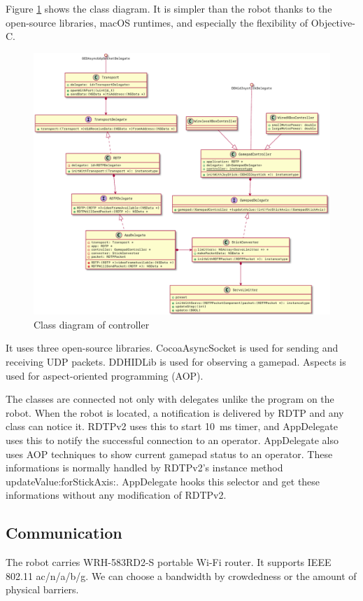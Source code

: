 \documentclass[journal]{IEEEtran}
\begin{document}
Figure \ref{fig:class_controller} shows the class diagram.
It is simpler than the robot thanks to the open-source libraries, macOS runtimes, and especially the flexibility of Objective-C.
\begin{figure}
    \centering
    \includegraphics[width=1.0\textwidth]{controllerClass.pdf}
    \caption{Class diagram of controller} \label{fig:class_controller}
\end{figure}
It uses three open-source libraries.
CocoaAsyncSocket is used for sending and receiving UDP packets.
DDHIDLib is used for observing a gamepad.
Aspects is used for aspect-oriented programming (AOP).

The classes are connected not only with delegates unlike the program on the robot.
When the robot is located, a notification is delivered by RDTP and any class can notice it.
RDTPv2 uses this to start \SI{10}{\ms} timer, and AppDelegate uses this to notify the successful connection to an operator.
AppDelegate also uses AOP techniques to show current gamepad status to an operator.
These informations is normally handled by RDTPv2's instance method updateValue:forStickAxis:.
AppDelegate hooks this selector and get these informations without any modification of RDTPv2.

\subsection{Communication}
The robot carries WRH-583RD2-S portable Wi-Fi router.
It supports IEEE 802.11 ac/n/a/b/g.
We can choose a bandwidth by crowdedness or the amount of physical barriers.
\end{document}
